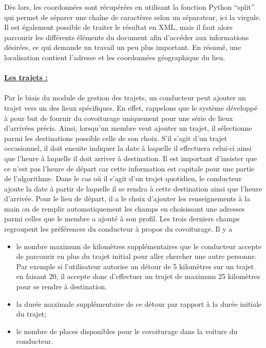 \documentclass[12pt, a4paper, oneside]{article}
\begin{document}
    Dès lors, les coordonnées sont récupérées en utilisant la fonction Python ``split'' ~\cite{python-split} qui permet de séparer une chaîne de caractères selon un séparateur, ici la virgule. Il est également possible de traiter le résultat en XML, mais il faut alors parcourir les différents éléments du document afin d'accéder aux informations désirées, ce qui demande un travail un peu plus important. En résumé, une localisation contient l'adresse et les coordonnées géographique du lieu.\\\\
    \underline{\textbf{Les trajets :}}\\\\
    \indent Par le biais du module de gestion des trajets, un conducteur peut ajouter un trajet vers un des lieux spécifiques. En effet, rappelons que le système développé à pour but de fournir du covoiturage uniquement pour une série de lieux d'arrivées précis. Ainsi, lorsqu'un membre veut ajouter un trajet, il sélectionne parmi les destinations possible celle de son choix. S'il s'agit d'un trajet occasionnel, il doit ensuite indiquer la date à laquelle il effectuera celui-ci ainsi que l'heure à laquelle il doit arriver à destination. Il est important d'insister que ce n'est pas l'heure de départ car cette information est capitale pour une partie de l'algorithme. Dans le cas où il s'agit d'un trajet quotidien, le conducteur ajoute la date à partir de laquelle il se rendra à cette destination ainsi que l'heure d'arrivée. Pour le lieu de départ, il a le choix d'ajouter les renseignements à la main ou de remplir automatiquement les champs en choisissant une adresses parmi celles que le membre a ajouté à son profil. Les trois derniers champs regroupent les préférences du conducteur à propos du covoiturage. Il y a \\
    \begin{itemize}
        \item le nombre maximum de kilomètres supplémentaires que le conducteur accepte de parcourir en plus du trajet initial pour aller chercher une autre personne. Par exemple si l'utilisateur autorise un détour de 5 kilomètres sur un trajet en faisant 20, il accepte donc d'effectuer un trajet de maximum 25 kilomètres pour se rendre à destination.\\
        \item la durée maximale supplémentaire de ce détour par rapport à la durée initiale du trajet;\\
        \item le nombre de places disponibles pour le covoiturage dans la voiture du conducteur.\\
    \end{itemize}
\end{document}
